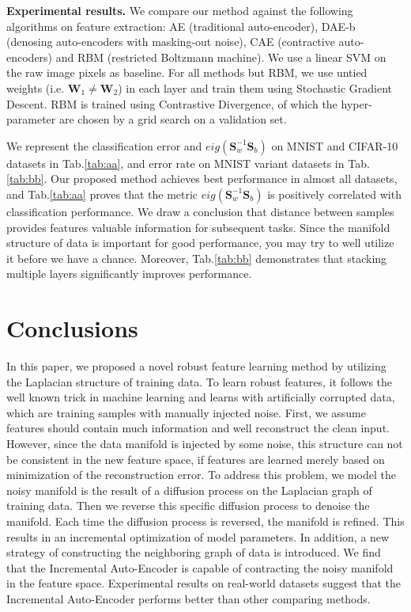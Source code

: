 \documentclass{article}
\def \SSS{\mathbf S}
\def \W{\mathbf W}
\begin{document}
{\bf Experimental results.}
We compare our method against the following algorithms on feature extraction:
AE (traditional auto-encoder),
DAE-b (denosing auto-encoders with masking-out noise),
CAE (contractive auto-encoders)
and RBM (restricted Boltzmann machine).
We use a linear SVM on the raw image pixels as baseline.
For all methods but RBM,
we use untied weights (i.e. $\W_1\neq\W_2$) in each layer
and train them using Stochastic Gradient Descent.
RBM is trained using Contrastive Divergence,
of which the hyper-parameter are chosen by a grid search on a validation set.

We represent the classification error and $eig(\SSS^{-1}_w\SSS_b)$
on MNIST and CIFAR-10 datasets in Tab.\ref{tab:aa},
and error rate on MNIST variant datasets in Tab.\ref{tab:bb}.
Our proposed method achieves best performance in almost all datasets,
and Tab.\ref{tab:aa} proves that the metric $eig(\SSS^{-1}_w\SSS_b)$ is positively correlated with classification performance.
We draw a conclusion that distance between samples provides features valuable information for subsequent tasks.
Since the manifold structure of data is important for good performance,
you may try to well utilize it before we have a chance.
Moreover,
Tab.\ref{tab:bb} demonstrates that stacking multiple layers significantly improves performance.


\section{Conclusions}
In this paper, we proposed a novel robust feature learning method by utilizing the Laplacian structure of training data. To learn robust features, it follows the well known trick in machine learning and learns with artificially corrupted data, which are training samples with manually injected noise. First, we assume features should contain much information and well reconstruct the clean input. However, since the data manifold is injected by some noise, this structure can not be consistent in the new feature space, if features are learned merely based on minimization of the reconstruction error. To address this problem, we model the noisy manifold is the result of a diffusion process on the Laplacian graph of training data. Then we reverse this specific diffusion process to denoise the manifold. Each time the diffusion process is reversed, the manifold is refined. This results in an incremental optimization of model parameters.  In addition, a new strategy of constructing the neighboring graph of data is introduced. We find that the Incremental Auto-Encoder is capable of contracting the noisy manifold in the feature space.  Experimental results on real-world datasets suggest that the Incremental Auto-Encoder performs better than other comparing methods.





\end{document}
